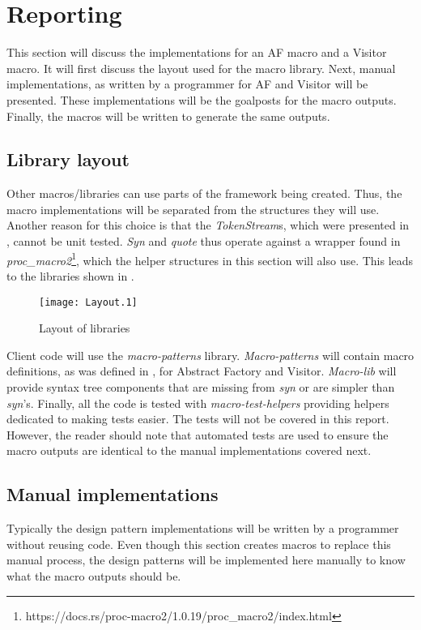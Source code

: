 \section{Reporting}
\label{sec:reporting}
This section will discuss the implementations for an AF macro and a Visitor macro.
It will first discuss the layout used for the macro library.
Next, manual implementations, as written by a programmer for AF and Visitor will be presented.
These implementations will be the goalposts for the macro outputs.
Finally, the macros will be written to generate the same outputs.

\subsection{Library layout}
Other macros/libraries can use parts of the framework being created.
Thus, the macro implementations will be separated from the structures they will use.
Another reason for this choice is that the \textit{TokenStream}s, which were presented in , cannot be unit tested.
\textit{Syn} and \textit{quote} thus operate against a wrapper found in \textit{proc\_macro2}\footnote{https://docs.rs/proc-macro2/1.0.19/proc\_macro2/index.html}, which the helper structures in this section will also use.
This leads to the libraries shown in .

\begin{figure}[h]
	\centering
	\texttt{[image: Layout.1]}
	\caption{Layout of libraries}
	\label{fig:LibraryLayout}
\end{figure}

Client code will use the \textit{macro-patterns} library.
\textit{Macro-patterns} will contain macro definitions, as was defined in , for Abstract Factory and Visitor.
\textit{Macro-lib} will provide syntax tree components that are missing from \textit{syn} or are simpler than \textit{syn}'s.
Finally, all the code is tested with \textit{macro-test-helpers} providing helpers dedicated to making tests easier.
The tests will not be covered in this report.
However, the reader should note that automated tests are used to ensure the macro outputs are identical to the manual implementations covered next.

\subsection{Manual implementations}
\label{sec:manual-implementations}
Typically the design pattern implementations will be written by a programmer without reusing code.
Even though this section creates macros to replace this manual process, the design patterns will be implemented here manually to know what the macro outputs should be.


